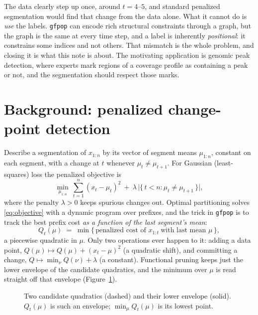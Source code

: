 \documentclass[11pt]{article}
\theoremstyle{definition}
\theoremstyle{plain}
\theoremstyle{remark}
\begin{document}
The data clearly step up once, around $t=4$--$5$, and standard penalized
segmentation would find that change from the data alone. What it cannot do is
\emph{use} the labels. \texttt{gfpop} can encode rich structural constraints
through a graph, but the graph is the same at every time step, and a label is
inherently \emph{positional}: it constrains some indices and not others. That
mismatch is the whole problem, and closing it is what this note is about. The
motivating application is genomic peak detection, where experts mark regions of
a coverage profile as containing a peak or not, and the segmentation should
respect those marks.

\section{Background: penalized change-point detection}\label{sec:back-fpop}

Describe a segmentation of $x_{1:n}$ by its vector of segment means
$\mu_{1:n}$, constant on each segment, with a change at $t$ whenever
$\mu_t \neq \mu_{t+1}$. For Gaussian (least-squares) loss the penalized
objective is
\begin{equation}\label{eq:objective}
  \min_{\mu_{1:n}} \ \sum_{t=1}^n (x_t-\mu_t)^2
    \ +\ \lambda \, \bigl|\{\, t< n : \mu_t \neq \mu_{t+1}\,\}\bigr|,
\end{equation}
where the penalty $\lambda>0$ keeps spurious changes out. Optimal partitioning
solves \eqref{eq:objective} with a dynamic program over prefixes, and the trick
in \texttt{gfpop} is to track the best prefix cost \emph{as a function of the
last segment's mean}:
\[
  Q_t(\mu) \;=\; \min\bigl\{\, \text{penalized cost of } x_{1:t}
      \ \text{with last mean } \mu \,\bigr\},
\]
a piecewise quadratic in $\mu$. Only two operations ever happen to it: adding a
data point, $Q(\mu)\mapsto Q(\mu)+(x_t-\mu)^2$ (a quadratic shift), and
committing a change, $Q \mapsto \min_\nu Q(\nu) + \lambda$ (a constant).
Functional pruning keeps just the lower envelope of the candidate quadratics,
and the minimum over $\mu$ is read straight off that envelope
(Figure~\ref{fig:envelope}).

\begin{figure}[h]
\centering
{}
\caption{Two candidate quadratics (dashed) and their lower envelope (solid).
$Q_t(\mu)$ is such an envelope; $\min_\mu Q_t(\mu)$ is its lowest point.}
\label{fig:envelope}
\end{figure}
\end{document}
